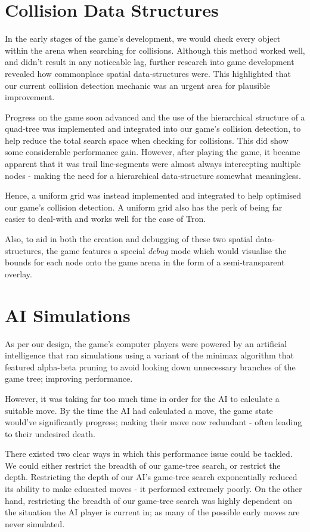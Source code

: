 \documentclass{standalone}
\begin{document}
	\section{Collision Data Structures}
		In the early stages of the game's development, we would check every object within the arena when searching for collisions. Although this method worked well, and didn't result in any noticeable lag, further research into game development revealed how commonplace spatial data-structures were. This highlighted that our current collision detection mechanic was an urgent area for plausible improvement.

		Progress on the game soon advanced and the use of the hierarchical structure of a quad-tree was implemented and integrated into our game's collision detection, to help reduce the total search space when checking for collisions. This did show some considerable performance gain. However, after playing the game, it became apparent that it was trail line-segments were almost always intercepting multiple nodes - making the need for a hierarchical data-structure somewhat meaningless.

		Hence, a uniform grid was instead implemented and integrated to help optimised our game's collision detection. A uniform grid also has the perk of being far easier to deal-with and works well for the case of Tron.

		Also, to aid in both the creation and debugging of these two spatial data-structures, the game features a special \emph{debug} mode which would visualise the bounds for each node onto the game arena in the form of a semi-transparent overlay.

	\section{AI Simulations}
		As per our design, the game's computer players were powered by an artificial intelligence that ran simulations using a variant of the minimax algorithm \parencite{minimax} that featured alpha-beta pruning \parencite{alphaBeta} to avoid looking down unnecessary branches of the game tree; improving performance.

		However, it was taking far too much time in order for the AI to calculate a suitable move. By the time the AI had calculated a move, the game state would've significantly progress; making their move now redundant - often leading to their undesired death.

		There existed two clear ways in which this performance issue could be tackled. We could either restrict the breadth of our game-tree search, or restrict the depth. Restricting the depth of our AI's game-tree search exponentially reduced its ability to make educated moves - it performed extremely poorly. On the other hand, restricting the breadth of our game-tree search was highly dependent on the situation the AI player is current in; as many of the possible early moves are never simulated.
\end{document}
